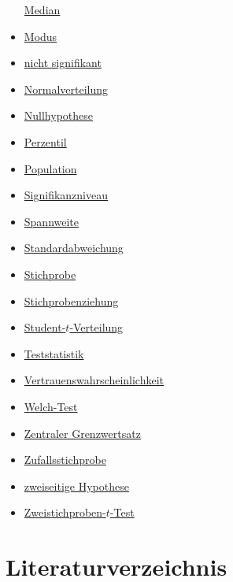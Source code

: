 \documentclass[
]{book}
\theoremstyle{definition}
\theoremstyle{definition}
\theoremstyle{definition}
\theoremstyle{definition}
\theoremstyle{remark}
\begin{document}
\begin{itemize}
  \hyperref[customdef-median]{Median}
\item
  \hyperref[customdef-modus]{Modus}
\item
  \hyperref[customdef-signifikanz]{nicht signifikant}
\item
  \hyperref[customdef-normalverteilung]{Normalverteilung}
\item
  \hyperref[customdef-nullhypothese]{Nullhypothese}
\item
  \hyperref[customdef-perzentil]{Perzentil}
\item
  \hyperref[customdef-population]{Population}
\item
  \hyperref[customdef-signifikanzniveau]{Signifikanzniveau}
\item
  \hyperref[customdef-spannweite]{Spannweite}
\item
  \hyperref[customdef-std]{Standardabweichung}
\item
  \hyperref[customdef-stichprobe]{Stichprobe}
\item
  \hyperref[customdef-stichprobenziehung]{Stichprobenziehung}
\item
  \hyperref[customdef-student-verteilung]{Student-\(t\)-Verteilung}
\item
  \hyperref[customdef-teststatistik]{Teststatistik}
\item
  \hyperref[customdef-confidence-level]{Vertrauenswahrscheinlichkeit}
\item
  \hyperref[customdef-welch-test]{Welch-Test}
\item
  \hyperref[customdef-zentraler-grenzwertsatz]{Zentraler Grenzwertsatz}
\item
  \hyperref[customdef-zufallsstichprobe]{Zufallsstichprobe}
\item
  \hyperref[customdef-zweiseitige-hypothese]{zweiseitige Hypothese}
\item
  \hyperref[customdef-twosample-t-test]{Zweistichproben-\(t\)-Test}
\end{itemize}

\chapter*{Literaturverzeichnis}\label{literaturverzeichnis}

  
\end{document}
